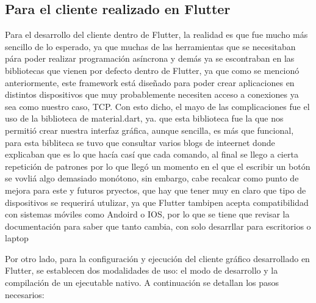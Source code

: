 \subsection{Para el cliente realizado en Flutter}
Para el desarrollo del cliente dentro de Flutter, la realidad es que fue mucho más sencillo de lo esperado, ya que muchas de las herramientas que se necesitaban pára poder realizar programación asíncrona y demás ya se escontraban en las bibliotecas que vienen por defecto dentro de Flutter, ya que como se mencionó anteriormente, este framework está diseñado para poder crear aplicaciones en distintos dispositivos que muy probablemente necesiten acceso a conexiones ya sea como nuestro caso, TCP.
Con esto dicho, el mayo de las complicaciones fue el uso de la biblioteca de material.dart, ya. que esta biblioteca fue la que nos permitió crear nuestra interfaz gráfica, aunque sencilla, es más que funcional, para esta bibliteca se tuvo que consultar varios blogs de inteernet donde explicaban que es lo que hacía casí que cada comando, al final se llego a cierta repetición de patrones por lo que llegó un momento en el que el escribir un botón se vovliá algo demasiado monótono, sin embargo, cabe recalcar como punto de mejora para este y futuros pryectos, que hay que tener muy en claro que tipo de dispositivos se requerirá utulizar, ya que Flutter tambipen acepta compatibilidad con sistemas móviles como Andoird o IOS, por lo que se tiene que revisar la documentación para saber que tanto cambia, con solo desarrllar para escritorios o laptop

Por otro lado, para la configuración y ejecución del cliente gráfico desarrollado en Flutter, se establecen dos modalidades de uso: el modo de desarrollo y la compilación de un ejecutable nativo. A continuación se detallan los pasos necesarios:

